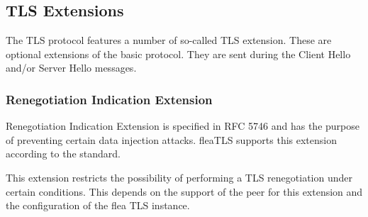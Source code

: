 \documentclass[a4paper,11pt]{scrartcl}
\begin{document}

\subsection{TLS Extensions}

The TLS protocol features a number of so-called TLS extension. These are
optional extensions of the basic protocol. They are sent during the Client Hello
and/or Server Hello messages. 

\subsubsection{Renegotiation Indication Extension}
Renegotiation Indication Extension is specified in RFC 5746 and has the purpose
of preventing certain data injection attacks. fleaTLS supports this extension
according to the standard.  

This extension restricts the possibility of performing a TLS renegotiation under
certain conditions. This depends on the support of the peer for this extension
and the configuration of the flea TLS instance. 
\end{document}
